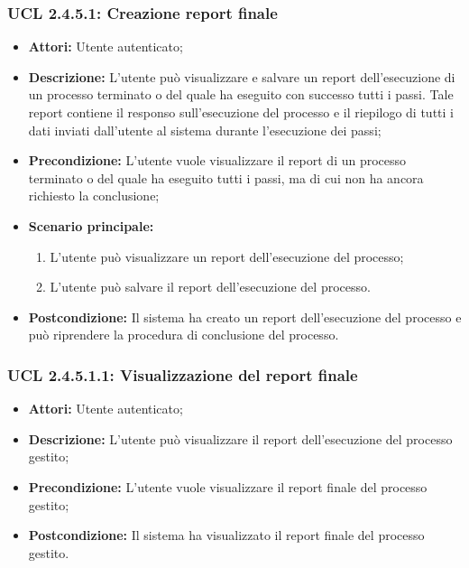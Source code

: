 \hypertarget{L2.4.5.1}{}
\subsubsection{UCL 2.4.5.1: Creazione report finale}
\begin{itemize}
\item \textbf{Attori:} Utente autenticato;
\item \textbf{Descrizione:} L'utente può visualizzare e salvare un report dell'esecuzione di un processo terminato o del quale ha eseguito con successo tutti i passi. Tale report contiene il responso sull'esecuzione del processo e il riepilogo di tutti i dati inviati dall'utente al sistema durante l'esecuzione dei passi;
\item \textbf{Precondizione:} L'utente vuole visualizzare il report di un processo terminato o del quale ha eseguito tutti i passi, ma di cui non ha ancora richiesto la conclusione;
\item \textbf{Scenario principale:}
\begin{enumerate}
\item L'utente può visualizzare un report dell'esecuzione del processo;
\item L'utente può salvare il report dell'esecuzione del processo.
\end{enumerate}
\item \textbf{Postcondizione:} Il sistema ha creato un report dell'esecuzione del processo e può riprendere la procedura di conclusione del processo.
\end{itemize}

\hypertarget{L2.4.5.1.1}{}
\subsubsection{UCL 2.4.5.1.1: Visualizzazione del report finale}
\begin{itemize}
\item \textbf{Attori:} Utente autenticato;
\item \textbf{Descrizione:} L'utente può visualizzare il report dell'esecuzione del processo gestito;
\item \textbf{Precondizione:} L'utente vuole visualizzare il report finale del processo gestito;
\item \textbf{Postcondizione:} Il sistema ha visualizzato il report finale del processo gestito.
\end{itemize}

